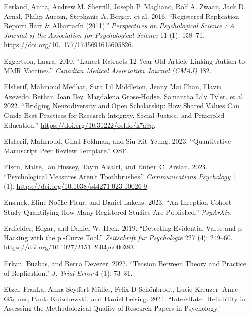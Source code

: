 \documentclass[
  letterpaper,
  DIV=11,
  numbers=noendperiod]{scrreprt}
\newlength{\cslhangindent}
\newenvironment{CSLReferences}[2] %
 {\begin{list}{}{%
  \setlength{\itemindent}{0pt}
  \setlength{\leftmargin}{0pt}
  \setlength{\parsep}{0pt}
  \ifodd #1
   \setlength{\leftmargin}{\cslhangindent}
   \setlength{\itemindent}{-1\cslhangindent}
  \fi
  \setlength{\itemsep}{#2\baselineskip}}}
 {\end{list}}
\begin{document}
\begin{CSLReferences}{1}{0}
Eerland, Anita, Andrew M. Sherrill, Joseph P. Magliano, Rolf A. Zwaan,
Jack D. Arnal, Philip Aucoin, Stephanie A. Berger, et al. 2016.
{``Registered Replication Report: Hart {\&} Albarrac{í}n (2011).''}
\emph{Perspectives on Psychological Science : A Journal of the
Association for Psychological Science} 11 (1): 158--71.
\url{https://doi.org/10.1177/1745691615605826}.

Eggertson, Laura. 2010. {``Lancet Retracts 12-Year-Old Article Linking
Autism to MMR Vaccines.''} \emph{Canadian Medical Association Journal
(CMAJ)} 182.

Elsherif, Mahmoud Medhat, Sara Lil Middleton, Jenny Mai Phan, Flavio
Azevedo, Bethan Joan Iley, Magdalena Grose-Hodge, Samantha Lily Tyler,
et al. 2022. {``Bridging Neurodiversity and Open Scholarship: How Shared
Values Can Guide Best Practices for Research Integrity, Social Justice,
and Principled Education.''}
\url{https://doi.org/10.31222/osf.io/k7a9p}.

Elsherif, Mahmoud, Gilad Feldman, and Siu Kit Yeung. 2023.
{``Quantitative Manuscript Peer Review Template.''} OSF.

Elson, Malte, Ian Hussey, Taym Alsalti, and Ruben C. Arslan. 2023.
{``Psychological Measures Aren't Toothbrushes.''} \emph{Communications
Psychology} 1 (1). \url{https://doi.org/10.1038/s44271-023-00026-9}.

Ensinck, Eline Noëlle Fleur, and Daniel Lakens. 2023. {``An Inception
Cohort Study Quantifying How Many Registered Studies Are Published.''}
\emph{PsyArXiv}.

Erdfelder, Edgar, and Daniel W. Heck. 2019. {``Detecting Evidential
Value and p -Hacking with the p -Curve Tool.''} \emph{Zeitschrift f{ü}r
Psychologie} 227 (4): 249--60.
\url{https://doi.org/10.1027/2151-2604/a000383}.

Erkan, Buzbas, and Berna Devezer. 2023. {``Tension Between Theory and
Practice of Replication.''} \emph{J. Trial Error} 4 (1): 73--81.

Etzel, Franka, Anna Seyffert-Müller, Felix D Schönbrodt, Lucie Kreuzer,
Anne Gärtner, Paula Knischewski, and Daniel Leising. 2024.
{``Inter-Rater Reliability in Assessing the Methodological Quality of
Research Papers in Psychology.''}


\end{CSLReferences}
\end{document}
